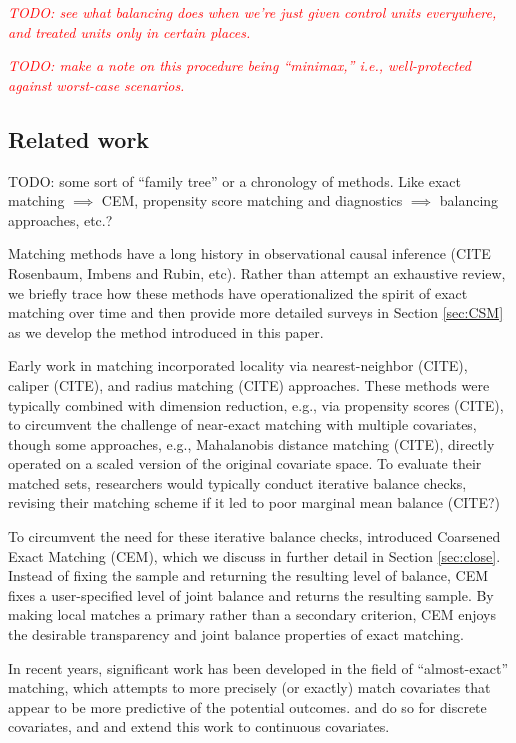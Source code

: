 \documentclass{article}
\newcommand{\note}[1]{\textcolor{red}{\textit{#1}}}
\begin{document}
\note{TODO: see what balancing does when we're just given control units everywhere, and treated units only in certain places.}

\note{TODO: make a note on this procedure being ``minimax,'' i.e., well-protected against worst-case scenarios.}

\subsection{Related work}
\label{sec:related}

TODO: some sort of ``family tree'' or a chronology of methods.
Like exact matching $\implies$ CEM, propensity score matching and diagnostics $\implies$ balancing approaches, etc.?

Matching methods have a long history in observational causal inference (CITE Rosenbaum, Imbens and Rubin, etc).
Rather than attempt an exhaustive review, we briefly trace how these methods have operationalized the spirit of exact matching over time and then provide more detailed surveys in Section \ref{sec:CSM} as we develop the method introduced in this paper.

Early work in matching incorporated locality via nearest-neighbor (CITE), caliper (CITE), and radius matching (CITE) approaches.
These methods were typically combined with dimension reduction, e.g., via propensity scores (CITE), to circumvent the challenge of near-exact matching with multiple covariates,
though some approaches, e.g., Mahalanobis distance matching (CITE), directly operated on a scaled version of the original covariate space.
To evaluate their matched sets, researchers would typically conduct iterative balance checks, revising their matching scheme if it led to poor marginal mean balance (CITE?)

To circumvent the need for these iterative balance checks, \citet{iacus2012causal} introduced Coarsened Exact Matching (CEM), which we discuss in further detail in Section \ref{sec:close}.
Instead of fixing the sample and returning the resulting level of balance, CEM fixes a user-specified level of joint balance and returns the resulting sample.
By making local matches a primary rather than a secondary criterion, CEM enjoys the desirable transparency and joint balance properties of exact matching.

In recent years, significant work has been developed in the field of ``almost-exact'' matching, which attempts to more precisely (or exactly) match covariates that appear to be more predictive of the potential outcomes.
\citet{dieng2019interpretable} and \citet{wang2021flame} do so for discrete covariates, and \citet{morucci2020adaptive} and \citet{parikh2022malts} extend this work to continuous covariates.
\end{document}
